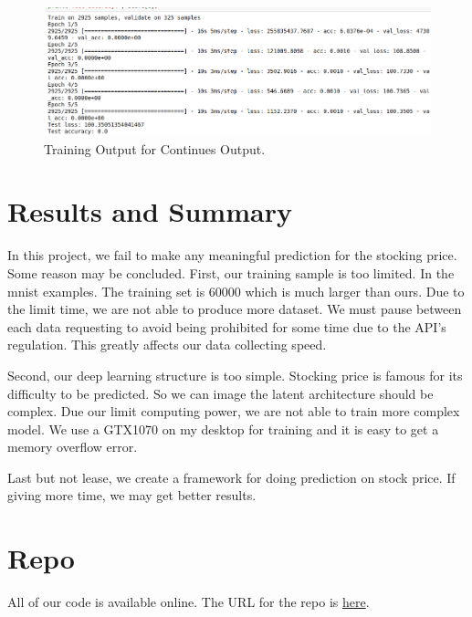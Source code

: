 \documentclass[12pt]{article}
\begin{document}
\begin{figure}[h]
	\centering
	\includegraphics[scale=0.5]{res2}
	\caption{Training Output for Continues Output.}
	\label{fig:tr2}
\end{figure}

\section{Results and Summary}
In this project, we fail to make any meaningful prediction for the stocking price. Some reason may be concluded. First, our training sample is too limited. In the mnist examples. The training set is 60000 which is much larger than ours. Due to the limit time, we are not able to produce more dataset. We must pause between each data requesting to avoid being prohibited for some time due to the API's regulation. This greatly affects our data collecting speed. 

Second, our deep learning structure is too simple. Stocking price is famous for its difficulty to be predicted. So we can image the latent architecture should be complex. Due our limit computing power, we are not able to train more complex model. We use a GTX1070 on my desktop for training and it is easy to get a memory overflow error. 

Last but not lease, we create a framework for doing prediction on stock price. If giving more time, we may get better results. 

\clearpage
\appendix
\section{Repo}
All of our code is available online. The URL for the repo is  \href{https://github.com/tgh1122334/surfdeep/tree/master/finalProj}{here}.
\end{document}

